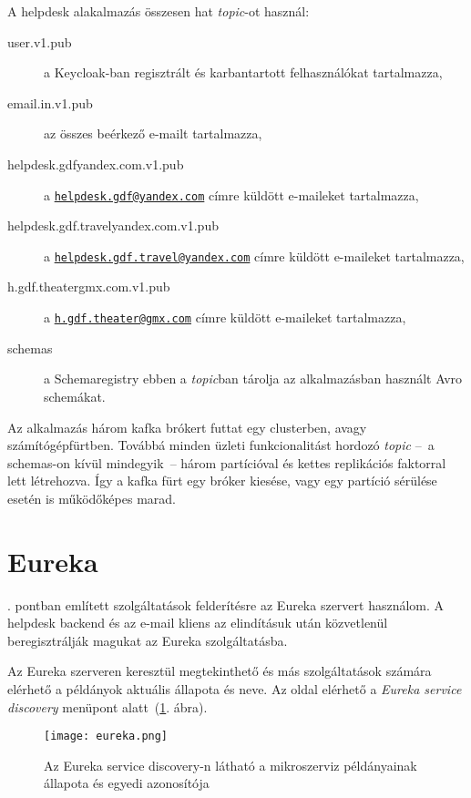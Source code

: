 A helpdesk alakalmazás összesen hat \emph{topic}-ot használ:
\begin{description}
	\item[user.v1.pub] a Keycloak-ban regisztrált és karbantartott felhasználókat tartalmazza,
	
	\item[email.in.v1.pub] az összes beérkező  e-mailt tartalmazza,
	
	\item[helpdesk.gdf\textunderscore yandex.com.v1.pub] a  \href{mailto:helpdesk.gdf@yandex.com}{\nolinkurl{helpdesk.gdf@yandex.com}} címre küldött e-maileket tartalmazza,
	
	\item[helpdesk.gdf.travel\textunderscore yandex.com.v1.pub] a \href{mailto:helpdesk.gdf.travel@yandex.com}{\nolinkurl{helpdesk.gdf.travel@yandex.com}} címre küldött e-maileket tartalmazza,
	
	
	\item[h.gdf.theater\textunderscore gmx.com.v1.pub] a \href{mailto:h.gdf.theater@gmx.com}{\nolinkurl{h.gdf.theater@gmx.com}} címre küldött e-maileket tartalmazza,
	
	\item[\textunderscore schemas] a Schemaregistry ebben a \emph{topic}ban tárolja az alkalmazásban használt Avro schemákat.
\end{description}


Az alkalmazás három kafka brókert futtat egy clusterben, avagy számítógépfürtben. Továbbá minden üzleti funkcionalitást hordozó \emph{topic} --~a \textunderscore schemas-on kívül mindegyik~-- három partícióval és kettes replikációs faktorral lett létrehozva.
Így a kafka fürt egy bróker kiesése, vagy egy partíció sérülése esetén is működőképes marad.


\section{Eureka}
. pontban említett szolgáltatások felderítésre az Eureka szervert használom. A helpdesk backend és az e-mail kliens az elindításuk után közvetlenül beregisztrálják magukat az Eureka szolgáltatásba.

Az Eureka szerveren keresztül megtekinthető és más szolgáltatások számára elérhető a példányok aktuális állapota és neve. Az oldal elérhető a \emph{Eureka service discovery} menüpont alatt~(\ref{fig:eureka}. ábra).


\begin{figure}[hbt] 
	\centering
	\texttt{[image: eureka.png]}
	\caption[Az Eureka service discovery felülete]{Az Eureka service discovery-n látható a mikroszerviz példányainak állapota és egyedi azonosítója}
	\label{fig:eureka}
\end{figure}

